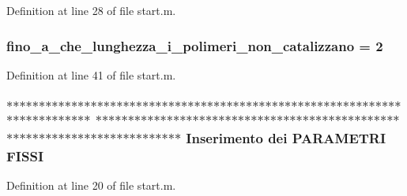Definition at line 28 of file start.\-m.

\hypertarget{a00113_ab6966d9ee620bc7376dc41a38352b948}{
\subsubsection[{fino\-\_\-a\-\_\-che\-\_\-lunghezza\-\_\-i\-\_\-polimeri\-\_\-non\-\_\-catalizzano}]{\setlength{\rightskip}{0pt plus 5cm}fino\-\_\-a\-\_\-che\-\_\-lunghezza\-\_\-i\-\_\-polimeri\-\_\-non\-\_\-catalizzano = 2}}\label{a00113_ab6966d9ee620bc7376dc41a38352b948}


Definition at line 41 of file start.\-m.

\hypertarget{a00113_aea8a3181c0f6f0f47e51930921720484}{
\subsubsection[{F\-I\-S\-S\-I}]{\setlength{\rightskip}{0pt plus 5cm}$\ast$$\ast$$\ast$$\ast$$\ast$$\ast$$\ast$$\ast$$\ast$$\ast$$\ast$$\ast$$\ast$$\ast$$\ast$$\ast$$\ast$$\ast$$\ast$$\ast$$\ast$$\ast$$\ast$$\ast$$\ast$$\ast$$\ast$$\ast$$\ast$$\ast$$\ast$$\ast$$\ast$$\ast$$\ast$$\ast$$\ast$$\ast$$\ast$$\ast$$\ast$$\ast$$\ast$$\ast$$\ast$$\ast$$\ast$$\ast$$\ast$$\ast$$\ast$$\ast$$\ast$$\ast$$\ast$$\ast$$\ast$$\ast$$\ast$$\ast$$\ast$$\ast$$\ast$$\ast$$\ast$$\ast$$\ast$$\ast$$\ast$$\ast$$\ast$$\ast$$\ast$$\ast$ $\ast$$\ast$$\ast$$\ast$$\ast$$\ast$$\ast$$\ast$$\ast$$\ast$$\ast$$\ast$$\ast$$\ast$$\ast$$\ast$$\ast$$\ast$$\ast$$\ast$$\ast$$\ast$$\ast$$\ast$$\ast$$\ast$$\ast$$\ast$$\ast$$\ast$$\ast$$\ast$$\ast$$\ast$$\ast$$\ast$$\ast$$\ast$$\ast$$\ast$$\ast$$\ast$$\ast$$\ast$$\ast$$\ast$$\ast$$\ast$$\ast$$\ast$$\ast$$\ast$$\ast$$\ast$$\ast$$\ast$$\ast$$\ast$$\ast$$\ast$$\ast$$\ast$$\ast$$\ast$$\ast$$\ast$$\ast$$\ast$$\ast$$\ast$$\ast$$\ast$$\ast$$\ast$ Inserimento dei P\-A\-R\-A\-M\-E\-T\-R\-I F\-I\-S\-S\-I}}\label{a00113_aea8a3181c0f6f0f47e51930921720484}


Definition at line 20 of file start.\-m.

